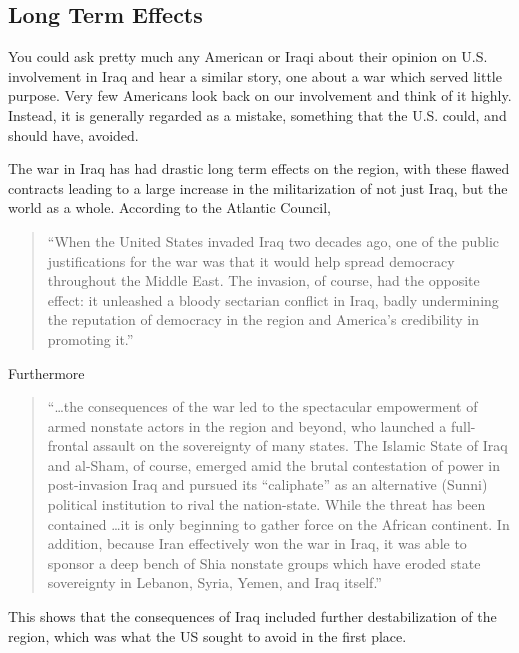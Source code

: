 \documentclass[12pt, twoside]{article}
\begin{document}
     \subsection{Long Term Effects}   
        You could ask pretty much any American or Iraqi about their opinion on U.S. involvement in Iraq and hear a similar story, one about a war which served little purpose. Very few Americans look back on our involvement and think of it highly. Instead, it is generally regarded as a mistake, something that the U.S. could, and should have, avoided. \parencite{igielnik2019wars} 

        The war in Iraq has had drastic long term effects on the region, with these flawed contracts leading to a large increase in the militarization of not just Iraq, but the world as a whole. According to the Atlantic Council,

        \begin{quotation}
            ``When the United States invaded Iraq two decades ago, one of the public justifications for the war was that it would help spread democracy throughout the Middle East. The invasion, of course, had the opposite effect: it unleashed a bloody sectarian conflict in Iraq, badly undermining the reputation of democracy in the region and America's credibility in promoting it.'' \parencite{atlanticcouncil_iraqwar2023}
        \end{quotation}

        Furthermore

        \begin{quotation}
            ``\ldots the consequences of the war led to the spectacular empowerment of armed nonstate actors in the region and beyond, who launched a full-frontal assault on the sovereignty of many states. The Islamic State of Iraq and al-Sham, of course, emerged amid the brutal contestation of power in post-invasion Iraq and pursued its “caliphate” as an alternative (Sunni) political institution to rival the nation-state. While the threat has been contained \ldots it is only beginning to gather force on the African continent. In addition, because Iran effectively won the war in Iraq, it was able to sponsor a deep bench of Shia nonstate groups which have eroded state sovereignty in Lebanon, Syria, Yemen, and Iraq itself.'' \parencite{atlanticcouncil_iraqwar2023}
        \end{quotation}

        This shows that the consequences of Iraq included further destabilization of the region, which was what the US sought to avoid in the first place. 
\end{document}

